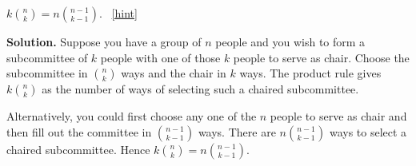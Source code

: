 \documentclass{book}
\begin{document}
\setcounter{project}{106}
\addtocounter{project}{-1}
\begin{activity}[]\label{activity-99}
\hypertarget{p-768}{}%
\(k \binom{n}{k} = n \binom{n - 1}{k - 1}\).%
~\hfill{\tiny\hyperlink{a-106}{[hint]}\hypertarget{q-106}{}}\par\smallskip%
\noindent\textbf{Solution.}\hypertarget{solution-80}{}\quad%
\hypertarget{p-770}{}%
Suppose you have a group of \(n\) people and you wish to form a subcommittee of \(k\) people with one of those \(k\) people to serve as chair. Choose the subcommittee in \(\binom{n}{k}\) ways and the chair in \(k\) ways. The product rule gives \(k \binom{n}{k}\) as the number of ways of selecting such a chaired subcommittee.%
\par
\hypertarget{p-771}{}%
Alternatively, you could first choose any one of the \(n\) people to serve as chair and then fill out the committee in \(\binom{n - 1}{k - 1}\) ways. There are \(n \binom{n - 1}{k - 1}\) ways to select a chaired subcommittee. Hence \(k \binom{n}{k} = n \binom{n - 1}{k - 1}\).%
\end{activity}
\end{document}
